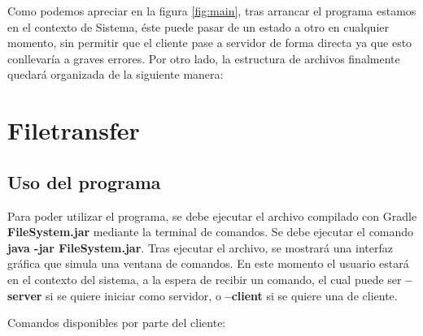 \documentclass[a4paper, 12pt]{report}
\begin{document}
Como podemos apreciar en la figura \ref{fig:main}, tras arrancar el programa estamos en el contexto de Sistema, éste puede pasar de un estado a otro en cualquier momento, sin permitir que el cliente pase a servidor de forma directa ya que esto conllevaría a graves errores.
Por otro lado, la estructura de archivos finalmente quedará organizada de la siguiente manera:

\newpage
\begin{figure}
\end{figure}

\chapter{Filetransfer}
\section{Uso del programa}

Para poder utilizar el programa, se debe ejecutar el archivo compilado con Gradle \textbf{FileSystem.jar}
mediante la terminal de comandos. Se debe ejecutar el comando \textbf{java -jar FileSystem.jar}. Tras ejecutar
el archivo, se mostrará una interfaz gráfica que simula una ventana de comandos. En este momento el usuario
estará en el contexto del sistema, a la espera de recibir un comando, el cual puede ser \textbf{--server} si se
quiere iniciar como servidor, o \textbf{--client} si se quiere una de cliente.

Comandos disponibles por parte del cliente:
\end{document}
